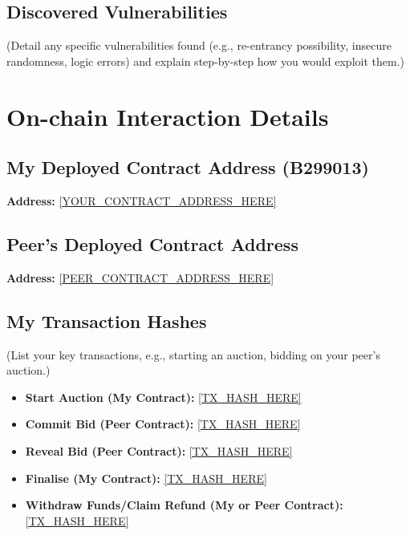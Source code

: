 \documentclass[11pt, a4paper]{article}
\begin{document}
\subsection{Discovered Vulnerabilities}
(Detail any specific vulnerabilities found (e.g., re-entrancy possibility, insecure randomness, logic errors) and explain step-by-step how you would exploit them.)


\section{On-chain Interaction Details}
\subsection{My Deployed Contract Address (B299013)}
\textbf{Address:} \href{https://sepolia.etherscan.io/address/[YOUR_CONTRACT_ADDRESS_HERE]}{[YOUR\_CONTRACT\_ADDRESS\_HERE]}

\subsection{Peer's Deployed Contract Address}
\textbf{Address:} \href{https://sepolia.etherscan.io/address/[PEER_CONTRACT_ADDRESS_HERE]}{[PEER\_CONTRACT\_ADDRESS\_HERE]}

\subsection{My Transaction Hashes}
(List your key transactions, e.g., starting an auction, bidding on your peer's auction.)
\begin{itemize}
    \item \textbf{Start Auction (My Contract):} \href{https://sepolia.etherscan.io/tx/[TX_HASH_HERE]}{[TX\_HASH\_HERE]}
    \item \textbf{Commit Bid (Peer Contract):} \href{https://sepolia.etherscan.io/tx/[TX_HASH_HERE]}{[TX\_HASH\_HERE]}
    \item \textbf{Reveal Bid (Peer Contract):} \href{https://sepolia.etherscan.io/tx/[TX_HASH_HERE]}{[TX\_HASH\_HERE]}
    \item \textbf{Finalise (My Contract):} \href{https://sepolia.etherscan.io/tx/[TX_HASH_HERE]}{[TX\_HASH\_HERE]}
    \item \textbf{Withdraw Funds/Claim Refund (My or Peer Contract):} \href{https://sepolia.etherscan.io/tx/[TX_HASH_HERE]}{[TX\_HASH\_HERE]}
\end{itemize}


\end{document}
